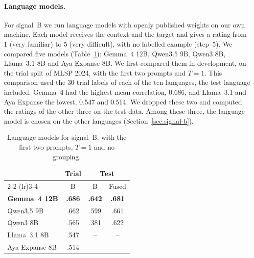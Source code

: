 \paragraph{Language models.} For signal~B we run language models with openly published weights on %
our own machine. Each model receives the context and the target and gives a rating from 1 (very
familiar) to 5 (very difficult), with no labelled example (step~5). We compared five models %
(Table~\ref{tab:llms}): Gemma~4 12B, Qwen3.5 9B, Qwen3 8B, Llama~3.1 8B and Aya Expanse 8B. We
first compared them in development, on the trial split of MLSP 2024, with the first two prompts and %
$T = 1$. This comparison used the 30 trial labels of each of the ten languages, the test language
included. Gemma~4 had the highest mean correlation, 0.686, and Llama~3.1 and Aya Expanse the %
lowest, 0.547 and 0.514. We dropped these two and computed the ratings of the other three on the
test data. Among these three, the language model is chosen on the other languages %
(Section~\ref{sec:signal-b}).

\begin{table}[t]
\centering
\small
\setlength{\tabcolsep}{3pt}
\begin{tabular}{lccc}
\toprule
 & Trial & \multicolumn{2}{c}{Test} \\
\cmidrule(lr){2-2} \cmidrule(lr){3-4}
 & B & B & Fused \\
\midrule
\textbf{Gemma~4 12B} & \textbf{.686} & \textbf{.642} & \textbf{.681} \\ %
Qwen3.5 9B           & .662 & .599 & .661 \\ %
Qwen3 8B             & .565 & .381 & .622 \\ %
Llama~3.1 8B         & .547 & --   & --   \\ %
Aya Expanse 8B       & .514 & --   & --   \\ %
\bottomrule
\end{tabular}
\caption{Language models for signal~B, with the first two prompts, $T = 1$ and no grouping.}
\label{tab:llms}
\end{table}

